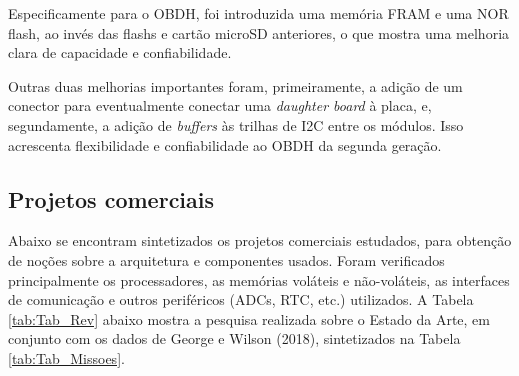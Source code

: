 Especificamente para o OBDH, foi introduzida uma memória FRAM e uma NOR flash, ao invés das flashs e cartão microSD anteriores, o que mostra uma melhoria clara de capacidade e confiabilidade. 

Outras duas melhorias importantes foram, primeiramente, a adição de um conector para eventualmente conectar uma \textit{daughter board} à placa, e, segundamente, a adição de \textit{buffers} às trilhas de I2C entre os módulos. Isso acrescenta flexibilidade e confiabilidade ao OBDH da segunda geração.

\subsection{Projetos comerciais}

Abaixo se encontram sintetizados os projetos comerciais estudados, para obtenção de noções sobre a arquitetura e componentes usados. Foram verificados principalmente os processadores, as memórias voláteis e não-voláteis, as interfaces de comunicação e outros periféricos (ADCs, RTC, etc.) utilizados. A Tabela \ref{tab:Tab_Rev} abaixo mostra a pesquisa realizada sobre o Estado da Arte, em conjunto com os dados de George e Wilson (2018), sintetizados na Tabela \ref{tab:Tab_Missoes}.

